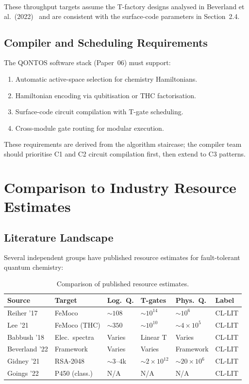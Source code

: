 \documentclass[conference]{IEEEtran}
\begin{document}
These throughput targets assume the T-factory designs analysed in Beverland et al.\ (2022)~\cite{beverland2022}
and are consistent with the surface-code parameters in Section~2.4.

\subsection{Compiler and Scheduling Requirements}

The QONTOS software stack (Paper~06) must support:

\begin{enumerate}[leftmargin=*]
\item Automatic active-space selection for chemistry Hamiltonians.
\item Hamiltonian encoding via qubitisation or THC factorisation.
\item Surface-code circuit compilation with T-gate scheduling.
\item Cross-module gate routing for modular execution.
\end{enumerate}

These requirements are derived from the algorithm staircase; the compiler team
should prioritise C1 and C2 circuit compilation first, then extend to C3 patterns.

\section{Comparison to Industry Resource Estimates}

\subsection{Literature Landscape}

Several independent groups have published resource estimates for fault-tolerant
quantum chemistry:

\begin{table}[H]
\centering
\caption{Comparison of published resource estimates.}
\label{tab:comparison}
\begin{tabular}{@{}l l l l l l@{}}
\toprule
\textbf{Source} & \textbf{Target} & \textbf{Log.\ Q.} & \textbf{T-gates} & \textbf{Phys.\ Q.} & \textbf{Label} \\
\midrule
Reiher '17 & FeMoco & ${\sim}108$ & ${\sim}10^{14}$ & ${\sim}10^6$ & CL-LIT \\
Lee '21 & FeMoco (THC) & ${\sim}350$ & ${\sim}10^{10}$ & ${\sim}4{\times}10^5$ & CL-LIT \\
Babbush '18 & Elec.\ spectra & Varies & Linear T & Varies & CL-LIT \\
Beverland '22 & Framework & Varies & Varies & Framework & CL-LIT \\
Gidney '21 & RSA-2048 & ${\sim}3$--$4$k & ${\sim}2{\times}10^{12}$ & ${\sim}20{\times}10^6$ & CL-LIT \\
Goings '22 & P450 (class.) & N/A & N/A & N/A & CL-LIT \\
\bottomrule
\end{tabular}
\end{table}
\end{document}
